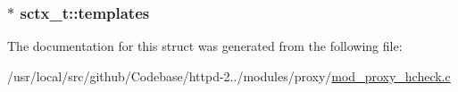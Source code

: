 \subsubsection[{\texorpdfstring{templates}{templates}}]{$\ast$ sctx\+\_\+t\+::templates}\hypertarget{structsctx__t_a89a8b9d8aa93bc9cc1fe1d79744ff107}{}\label{structsctx__t_a89a8b9d8aa93bc9cc1fe1d79744ff107}


The documentation for this struct was generated from the following file\+:\begin{DoxyCompactItemize}
\item 
/usr/local/src/github/\+Codebase/httpd-\/2../modules/proxy/\hyperlink{mod__proxy__hcheck_8c}{mod\+\_\+proxy\+\_\+hcheck.\+c}\end{DoxyCompactItemize}
